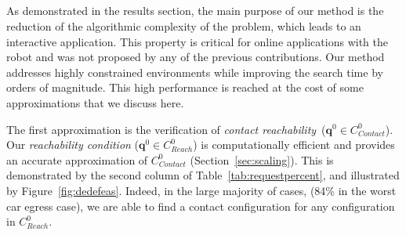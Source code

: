 \documentclass[journal]{IEEEtran}
\newcommand{\contactreachability}{\textit{contact reachability}}	%
\newcommand{\gls}[1]{\textit{#1}}
\providecommand{\DIFaddtex}[1]{#1} %
\providecommand{\DIFdeltex}[1]{} %
\providecommand{\DIFaddbegin}{\protect\color{blue}} %
\providecommand{\DIFaddend}{\protect\color{black}} %
\providecommand{\DIFdelbegin}{\protect\cbdelete} %
\providecommand{\DIFdelend}{} %
\providecommand{\DIFadd}[1]{\texorpdfstring{\DIFaddtex{#1}}{#1}} %
\providecommand{\DIFdel}[1]{\texorpdfstring{\DIFdeltex{#1}}{}} %
\begin{document}
\DIFdelbegin \subsection{\DIFdel{Accuracy and performance gain of the reachability condition}}
\addtocounter{subsection}{-1}%
\DIFdelend %

As demonstrated in the results section, the main \DIFdelbegin \DIFdel{interest }\DIFdelend \DIFaddbegin \DIFadd{purpose }\DIFaddend of our method is the reduction of the algorithmic complexity of the problem, which leads to an interactive 
application. This property is critical for 
online applications with the robot and was not proposed by any of the previous contributions. Our method addresses highly constrained environments while improving the search time by orders of magnitude. This high performance is reached at the cost of some approximations that we discuss here. 

The first approximation is the verification of \contactreachability\ ($\mathbf{q}^0 \in C_{Contact}^0$).  Our \textit{reachability condition} ($\mathbf{q}^0 \in C_{Reach}^0$) is computationally efficient and provides an accurate approximation of $C_{Contact}^0$ (Section~\ref{sec:scaling}). This is demonstrated by the second column of Table~\ref{tab:requestpercent}, and illustrated by Figure~\ref{fig:dedefeas}. Indeed, in the large majority of cases, (84\% in the worst car egress case), we are able to find a contact configuration for any configuration in $C_{Reach}^0$.

\end{document}
